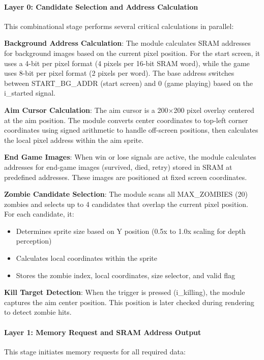 \documentclass[12pt,a4paper]{article}
\begin{document}
\paragraph{Layer 0: Candidate Selection and Address Calculation}
This combinational stage performs several critical calculations in parallel:

\textbf{Background Address Calculation}: The module calculates SRAM addresses for background images based on the current pixel position. For the start screen, it uses a 4-bit per pixel format (4 pixels per 16-bit SRAM word), while the game uses 8-bit per pixel format (2 pixels per word). The base address switches between START\_BG\_ADDR (start screen) and 0 (game playing) based on the i\_started signal.

\textbf{Aim Cursor Calculation}: The aim cursor is a 200×200 pixel overlay centered at the aim position. The module converts center coordinates to top-left corner coordinates using signed arithmetic to handle off-screen positions, then calculates the local pixel address within the aim sprite.

\textbf{End Game Images}: When win or lose signals are active, the module calculates addresses for end-game images (survived, died, retry) stored in SRAM at predefined addresses. These images are positioned at fixed screen coordinates.

\textbf{Zombie Candidate Selection}: The module scans all MAX\_ZOMBIES (20) zombies and selects up to 4 candidates that overlap the current pixel position. For each candidate, it:
\begin{itemize}
    \item Determines sprite size based on Y position (0.5x to 1.0x scaling for depth perception)
    \item Calculates local coordinates within the sprite
    \item Stores the zombie index, local coordinates, size selector, and valid flag
\end{itemize}

\textbf{Kill Target Detection}: When the trigger is pressed (i\_killing), the module captures the aim center position. This position is later checked during rendering to detect zombie hits.

\paragraph{Layer 1: Memory Request and SRAM Address Output}
This stage initiates memory requests for all required data:
\end{document}
